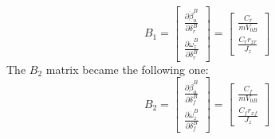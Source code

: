 \begin{equation} 
B_{1}=
\begin{bmatrix} 
\frac{\partial\dot{\beta}_{u}^{B}}{\partial\delta_{r}^{B}} \\
\frac{\partial\dot{\omega}_{z}^{B}}{\partial\delta_{r}^{B}}
\end{bmatrix} =
\begin{bmatrix} 
\frac{C_{r}}{m V_{0B}} \\ \frac{C_{r}r_{xr}}{J_{z}}
\end{bmatrix} 
\end{equation}
The $B_{2}$ matrix became the following one:
\begin{equation}
B_{2}=
\begin{bmatrix}
\frac{\partial\dot{\beta}_{u}^{B}}{\partial\delta_{f}^{B}} \\
\frac{\partial\dot{\omega}_{z}^{B}}{\partial\delta_{f}^{B}} 
\end{bmatrix} =
\begin{bmatrix}
\frac{C_{f}}{m V_{0B}} \\ \frac{C_{f}r_{xf}}{J_{z}}
\end{bmatrix} 
\end{equation}


